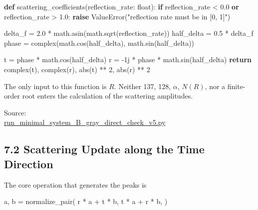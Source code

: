 \documentclass[
  10pt,
  a4paper,
]{article}
\newenvironment{Shaded}{}{}
\newcommand{\BuiltInTok}[1]{\textcolor[rgb]{0.00,0.50,0.00}{#1}}
\newcommand{\ControlFlowTok}[1]{\textcolor[rgb]{0.00,0.44,0.13}{\textbf{#1}}}
\newcommand{\DecValTok}[1]{\textcolor[rgb]{0.25,0.63,0.44}{#1}}
\newcommand{\FloatTok}[1]{\textcolor[rgb]{0.25,0.63,0.44}{#1}}
\newcommand{\KeywordTok}[1]{\textcolor[rgb]{0.00,0.44,0.13}{\textbf{#1}}}
\newcommand{\NormalTok}[1]{#1}
\newcommand{\OperatorTok}[1]{\textcolor[rgb]{0.40,0.40,0.40}{#1}}
\newcommand{\OtherTok}[1]{\textcolor[rgb]{0.00,0.44,0.13}{#1}}
\newcommand{\PreprocessorTok}[1]{\textcolor[rgb]{0.74,0.48,0.00}{#1}}
\newcommand{\StringTok}[1]{\textcolor[rgb]{0.25,0.44,0.63}{#1}}
\begin{document}
\begin{Shaded}
\begin{Highlighting}[]
\KeywordTok{def}\NormalTok{ scattering\_coefficients(reflection\_rate: }\BuiltInTok{float}\NormalTok{):}
    \ControlFlowTok{if}\NormalTok{ reflection\_rate }\OperatorTok{\textless{}} \FloatTok{0.0} \KeywordTok{or}\NormalTok{ reflection\_rate }\OperatorTok{\textgreater{}} \FloatTok{1.0}\NormalTok{:}
        \ControlFlowTok{raise} \PreprocessorTok{ValueError}\NormalTok{(}\StringTok{"reflection rate must be in [0, 1]"}\NormalTok{)}

\NormalTok{    delta\_f }\OperatorTok{=} \FloatTok{2.0} \OperatorTok{*}\NormalTok{ math.asin(math.sqrt(reflection\_rate))}
\NormalTok{    half\_delta }\OperatorTok{=} \FloatTok{0.5} \OperatorTok{*}\NormalTok{ delta\_f}
\NormalTok{    phase }\OperatorTok{=} \BuiltInTok{complex}\NormalTok{(math.cos(half\_delta), math.sin(half\_delta))}

\NormalTok{    t }\OperatorTok{=}\NormalTok{ phase }\OperatorTok{*}\NormalTok{ math.cos(half\_delta)}
\NormalTok{    r }\OperatorTok{=} \OperatorTok{{-}}\OtherTok{1j} \OperatorTok{*}\NormalTok{ phase }\OperatorTok{*}\NormalTok{ math.sin(half\_delta)}
    \ControlFlowTok{return} \BuiltInTok{complex}\NormalTok{(t), }\BuiltInTok{complex}\NormalTok{(r), }\BuiltInTok{abs}\NormalTok{(t) }\OperatorTok{**} \DecValTok{2}\NormalTok{, }\BuiltInTok{abs}\NormalTok{(r) }\OperatorTok{**} \DecValTok{2}
\end{Highlighting}
\end{Shaded}

The only input to this function is \(R\). Neither 137, 128, \(\alpha\),
\(N(R)\), nor a finite-order root enters the calculation of the
scattering amplitudes.

Source:\\
\href{../20260715/run_minimal_system_B_gray_direct_check_v5.py\#L48-L56}{run\_minimal\_system\_B\_gray\_direct\_check\_v5.py}

\subsection{7.2 Scattering Update along the Time
Direction}\label{scattering-update-along-the-time-direction}

The core operation that generates the peaks is

\begin{Shaded}
\begin{Highlighting}[]
\NormalTok{a, b }\OperatorTok{=}\NormalTok{ normalize\_pair(}
\NormalTok{    r }\OperatorTok{*}\NormalTok{ a }\OperatorTok{+}\NormalTok{ t }\OperatorTok{*}\NormalTok{ b,}
\NormalTok{    t }\OperatorTok{*}\NormalTok{ a }\OperatorTok{+}\NormalTok{ r }\OperatorTok{*}\NormalTok{ b,}
\NormalTok{)}
\end{Highlighting}
\end{Shaded}
\end{document}
